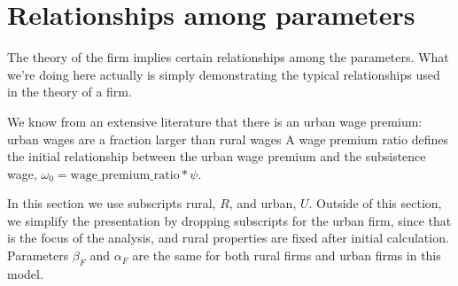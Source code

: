 

\section{Relationships among parameters} \label{section-firm-initial-values}





The theory of the firm implies certain relationships among the parameters. What we're doing here actually is simply demonstrating the typical relationships used in the theory of a firm.


We know from an extensive  literature that there is an urban wage premium: urban wages are a fraction larger than  rural wages A wage premium ratio defines the initial relationship between the urban wage premium and the subsistence wage, $\omega_0 = \mathrm{wage\_premium\_ratio} * \psi$. %

In this section we use subscripts rural, $R$, and urban, $U$. Outside of this section, we simplify the presentation by dropping subscripts for the urban firm, since that is the focus of the analysis, and rural properties are fixed after initial calculation. 
Parameters $\beta_F$ and $\alpha_F$ are the same for both rural firms and urban firms in this model. 

